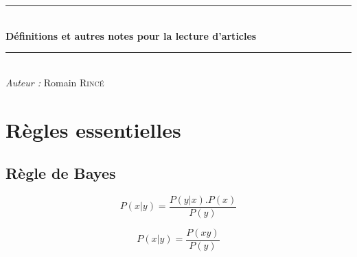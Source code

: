 \documentclass[11pt, a4paper]{article}
\newcommand{\reporttitle}{Définitions et autres notes pour la lecture d'articles}     %
\newcommand{\reportauthor}{Romain \textsc{Rincé}} %
\newcommand{\reportsubject}{} %
\newcommand{\HRule}{\rule{\linewidth}{0.3mm}}
\begin{document}
\begin{center}




\HRule \\[0.3cm]
{\bfseries \reporttitle}\\[0.3cm]
\HRule \\[2ex]
\emph{Auteur : } \reportauthor
%   
%
%

\end{center}

  

%	
%    
%    
%
%
%

\section{Règles essentielles}

\subsection*{Règle de Bayes}\begin{equation}
P(x|y) = \frac{P(y|x).P(x)}{P(y)}
\end{equation}

\begin{equation}
P(x|y) = \frac{P(xy)}{P(y)}
\end{equation}
\end{document}
